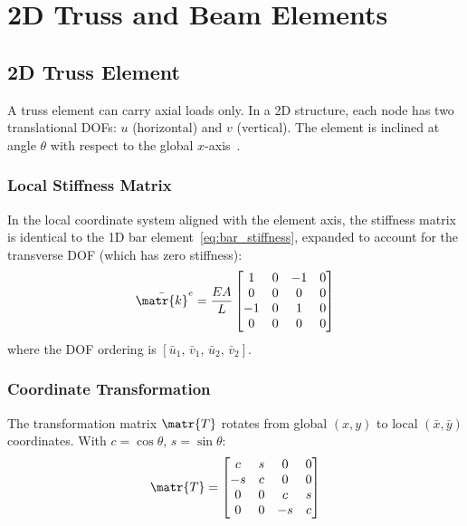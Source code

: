 \chapter{2D Truss and Beam Elements}
\label{ch:truss_beam}

\section{2D Truss Element}

A truss element can carry axial loads only. In a 2D structure, each node has
two translational DOFs: $u$ (horizontal) and $v$ (vertical). The element is
inclined at angle $\theta$ with respect to the global $x$-axis~\cite{cook2002concepts}.

\subsection{Local Stiffness Matrix}

In the local coordinate system aligned with the element axis, the stiffness
matrix is identical to the 1D bar element~\cref{eq:bar_stiffness}, expanded
to account for the transverse DOF (which has zero stiffness):
\begin{equation}
    \bar{\matr{k}}^e = \frac{EA}{L}
    \begin{bmatrix} 1 & 0 & -1 & 0 \\ 0 & 0 & 0 & 0 \\
                   -1 & 0 &  1 & 0 \\ 0 & 0 & 0 & 0 \end{bmatrix}
    \label{eq:truss_local}
\end{equation}
where the DOF ordering is $[\bar{u}_1,\, \bar{v}_1,\, \bar{u}_2,\, \bar{v}_2]$.

\subsection{Coordinate Transformation}

The transformation matrix $\matr{T}$ rotates from global $(x,y)$ to local
$(\bar{x}, \bar{y})$ coordinates. With $c = \cos\theta$, $s = \sin\theta$:
\begin{equation}
    \matr{T} = \begin{bmatrix}
         c & s & 0 & 0 \\
        -s & c & 0 & 0 \\
         0 & 0 & c & s \\
         0 & 0 &-s & c
    \end{bmatrix}
    \label{eq:truss_T}
\end{equation}

